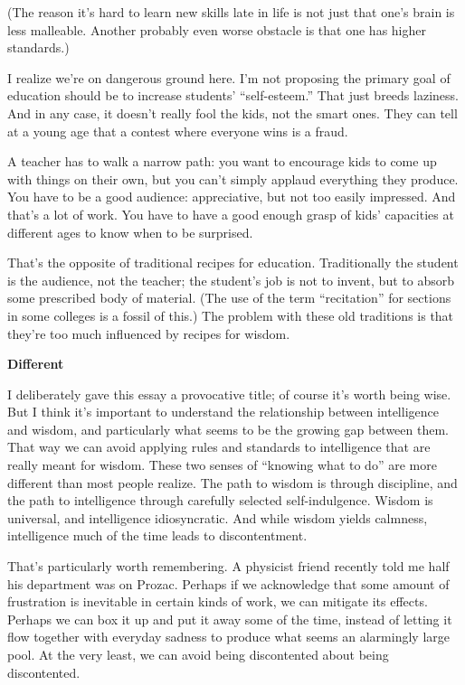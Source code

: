 (The reason it's hard to learn new skills late in life is not just that
one's brain is less malleable. Another probably even worse obstacle is
that one has higher standards.)

I realize we're on dangerous ground here. I'm not proposing the primary
goal of education should be to increase students' ``self-esteem.'' That
just breeds laziness. And in any case, it doesn't really fool the kids,
not the smart ones. They can tell at a young age that a contest where
everyone wins is a fraud.

A teacher has to walk a narrow path: you want to encourage kids to come
up with things on their own, but you can't simply applaud everything
they produce. You have to be a good audience: appreciative, but not too
easily impressed. And that's a lot of work. You have to have a good
enough grasp of kids' capacities at different ages to know when to be
surprised.

That's the opposite of traditional recipes for education. Traditionally
the student is the audience, not the teacher; the student's job is not
to invent, but to absorb some prescribed body of material. (The use of
the term ``recitation'' for sections in some colleges is a fossil of
this.) The problem with these old traditions is that they're too much
influenced by recipes for wisdom.

\textbf{Different}

I deliberately gave this essay a provocative title; of course it's worth
being wise. But I think it's important to understand the relationship
between intelligence and wisdom, and particularly what seems to be the
growing gap between them. That way we can avoid applying rules and
standards to intelligence that are really meant for wisdom. These two
senses of ``knowing what to do'' are more different than most people
realize. The path to wisdom is through discipline, and the path to
intelligence through carefully selected self-indulgence. Wisdom is
universal, and intelligence idiosyncratic. And while wisdom yields
calmness, intelligence much of the time leads to discontentment.

That's particularly worth remembering. A physicist friend recently told
me half his department was on Prozac. Perhaps if we acknowledge that
some amount of frustration is inevitable in certain kinds of work, we
can mitigate its effects. Perhaps we can box it up and put it away some
of the time, instead of letting it flow together with everyday sadness
to produce what seems an alarmingly large pool. At the very least, we
can avoid being discontented about being discontented.


